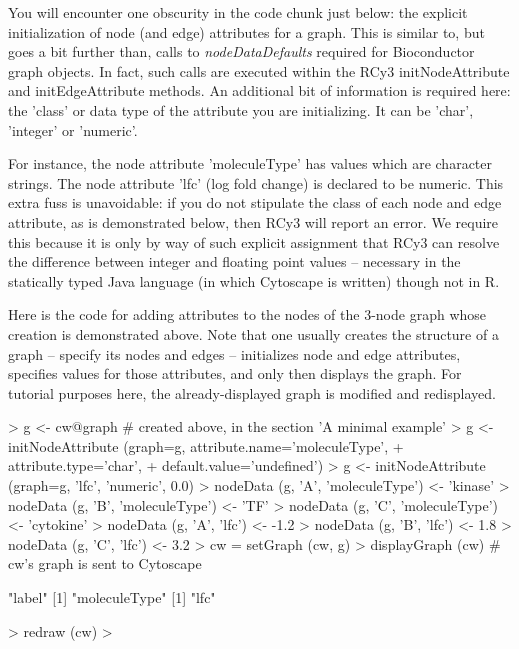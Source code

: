 \documentclass[12pt]{article}
\begin{document}
You will encounter one obscurity in the code chunk just below: the explicit initialization of node (and edge) attributes
for a graph.  This is similar to, but goes a bit further than, calls to \emph{nodeDataDefaults} required for
Bioconductor graph objects.  In fact, such calls are executed within the RCy3 initNodeAttribute and
initEdgeAttribute methods.  An additional bit of information is required here: the 'class' or data type of the attribute
you are initializing.  It can be 'char', 'integer' or 'numeric'.

For instance, the node attribute 'moleculeType' has values which are character strings.  The node attribute
'lfc' (log fold change) is declared to be numeric.  This extra fuss is unavoidable: if you do not stipulate the
class of each node and edge attribute, as is demonstrated below, then RCy3 will report an error.  We require this
because it is only by way of such explicit assignment that RCy3 can resolve the difference between integer and
floating point values -- necessary in the statically typed Java language (in which Cytoscape is written) though not in
R.

Here is the code for adding attributes to the nodes of the 3-node graph whose creation is demonstrated above.  Note that
one usually creates the structure of a graph -- specify its nodes and edges -- initializes node and edge attributes,
specifies values for those attributes, and only then displays the graph.  For tutorial purposes here, the
already-displayed graph is modified and redisplayed.

\begin{Schunk}
\begin{Sinput}
>   g <- cw@graph   # created above, in the section  'A minimal example'
>   g <- initNodeAttribute (graph=g,  attribute.name='moleculeType',
+                           attribute.type='char',
+                           default.value='undefined')
>   g <- initNodeAttribute (graph=g,  'lfc', 'numeric', 0.0)
>   nodeData (g, 'A', 'moleculeType') <- 'kinase'
>   nodeData (g, 'B', 'moleculeType') <- 'TF'
>   nodeData (g, 'C', 'moleculeType') <- 'cytokine'
>   nodeData (g, 'A', 'lfc') <- -1.2
>   nodeData (g, 'B', 'lfc') <- 1.8
>   nodeData (g, 'C', 'lfc') <- 3.2
>   cw = setGraph (cw, g)
>   displayGraph (cw)    # cw's graph is sent to Cytoscape
\end{Sinput}
\begin{Soutput}
[1] "label"
[1] "moleculeType"
[1] "lfc"
\end{Soutput}
\begin{Sinput}
>   redraw (cw)
>   
\end{Sinput}
\end{Schunk}
\end{document}
